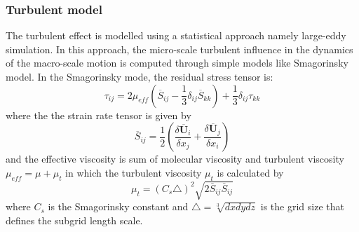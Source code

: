 \documentclass[preprint,12pt]{elsarticle}
\begin{document}
\subsubsection{Turbulent model}
The turbulent effect is modelled using a statistical approach namely large-eddy simulation. In this approach, the micro-scale turbulent influence in the dynamics of the macro-scale motion is computed through simple models like Smagorinsky model. In the Smagorinsky mode, the residual stress tensor is:
%
\begin{equation}
     \tau_{ij} = 2 \mu_{eff} (\overline{S}_{ij} - \frac{1}{3} \delta_{ij} \overline{S}_{kk}) + \frac{1}{3} \delta_{ij} \tau_{kk}
\end{equation}
%
%
where the the strain rate tensor is given by
%
\begin{equation}
     \overline{S}_{ij} = \frac{1}{2} (\frac{\delta \overline{\pmb{U}}_i}{\delta x_j} + \frac{\delta \overline{\pmb{U}}_j}{\delta x_i})
\end{equation}
%
%
and the effective viscosity is sum of molecular viscosity and turbulent viscosity $\mu_{eff} = \mu + \mu_t$ in which the turbulent viscosity $\mu_t$ is calculated by
%
\begin{equation}
    \mu_t = (C_s \triangle)^2 \sqrt{2 \overline{S}_{ij} \overline{S}_{ij}}
\end{equation}
%
%
where $C_s$ is the Smagorinsky constant and $\triangle = \sqrt[3]{dx dy dz}$ is the grid size that defines the subgrid length scale.
\end{document}
